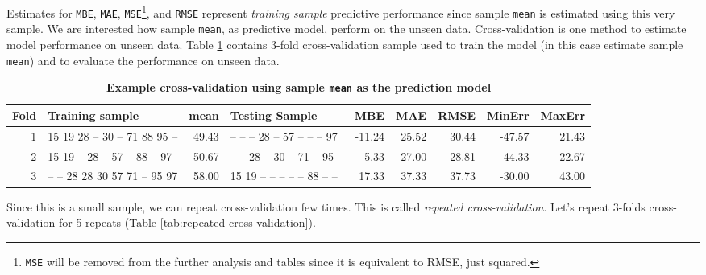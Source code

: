 \documentclass[
]{book}
\begin{document}
Estimates for \texttt{MBE}, \texttt{MAE}, \texttt{MSE}\footnote{\texttt{MSE} will be removed from the further analysis and tables since it is equivalent to RMSE, just squared.}, and \texttt{RMSE} represent \emph{training sample} predictive performance since sample \texttt{mean} is estimated using this very sample. We are interested how sample \texttt{mean}, as predictive model, perform on the unseen data. Cross-validation is one method to estimate model performance on unseen data. Table \ref{tab:mean-cross-validation} contains 3-fold cross-validation sample used to train the model (in this case estimate sample \texttt{mean}) and to evaluate the performance on unseen data.



\begin{table}

\caption{\label{tab:mean-cross-validation}\textbf{Example cross-validation using sample \texttt{mean} as the prediction model}}
\centering
\begin{tabular}[t]{rlrlrrrrr}
\toprule
Fold & Training sample & mean & Testing Sample & MBE & MAE & RMSE & MinErr & MaxErr\\
\midrule
1 & 15  19  28  --  30  --  71  88  95  -- & 49.43 & --  --  --  28  --  57  --  --  --  97 & -11.24 & 25.52 & 30.44 & -47.57 & 21.43\\
2 & 15  19  --  28  --  57  --  88  --  97 & 50.67 & --  --  28  --  30  --  71  --  95  -- & -5.33 & 27.00 & 28.81 & -44.33 & 22.67\\
3 & --  --  28  28  30  57  71  --  95  97 & 58.00 & 15  19  --  --  --  --  --  88  --  -- & 17.33 & 37.33 & 37.73 & -30.00 & 43.00\\
\bottomrule
\end{tabular}
\end{table}

Since this is a small sample, we can repeat cross-validation few times. This is called \emph{repeated cross-validation}. Let's repeat 3-folds cross-validation for 5 repeats (Table \ref{tab:repeated-cross-validation}).
\end{document}
